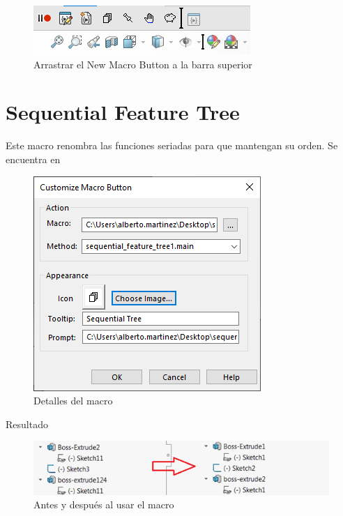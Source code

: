 \documentclass{report}
\begin{document}
\begin{figure}[H]
	\centering
	\includegraphics[width=0.65\linewidth, height=0.5\textheight,keepaspectratio]{Imagenes/solidworks_macro_03}
	\caption{Arrastrar el New Macro Button a la barra superior}
	\label{fig:solidworksmacro03}
\end{figure}



	
\section{Sequential Feature Tree}

Este macro renombra las funciones seriadas para que mantengan su orden. Se encuentra en 

\begin{figure}[H]
	\centering
	\includegraphics[width=0.55\linewidth, height=0.5\textheight,keepaspectratio]{Imagenes/solidworks_macro_04}
	\caption{Detalles del macro}
	\label{fig:solidworksmacro04}
\end{figure}

{\LARGE Resultado}

\begin{figure}[H]
	\centering
	\includegraphics[width=0.85\linewidth, height=0.5\textheight,keepaspectratio]{Imagenes/solidworks_macro_07}
	\caption{Antes y después al usar el macro}
	\label{fig:solidworksmacro07}
\end{figure}
\end{document}
